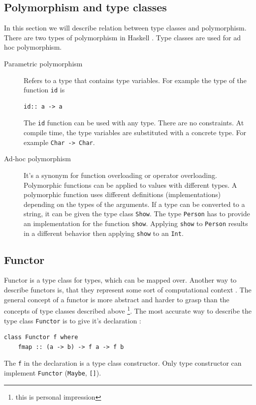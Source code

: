 \subsection{Polymorphism and type classes}
\label{sec:polymorphism}
In this section we will describe relation between type classes and polymorphism.
There are two types of polymorphism in Haskell \cite{Cardelli}. Type classes are used for ad hoc polymorphism.
\begin{description}
\item[Parametric polymorphism] Refers to a type that contains type variables. For example the type of the function \verb|id| is 
\begin{verbatim}
id:: a -> a
\end{verbatim}
The \verb|id| function can be used with any type. There are no constraints. At compile time, the type variables are substituted with a concrete type. For example
\verb|Char -> Char|.
\item[Ad-hoc polymorphism] It's a synonym for function overloading or operator overloading. Polymorphic functions can be applied to values with different types. A polymorphic function uses different definitions (implementations) depending on the types of the arguments. If a type can be converted to a string, it can be given the type class \verb|Show|. The type \verb|Person| has to provide an implementation for the function \verb|show|. Applying \verb|show| to \verb|Person| results in a different behavior then applying \verb|show| to an \verb|Int|.
\end{description}

\subsection{Functor}
\label{sec:functor}

Functor is a type class for types, which can be mapped over. Another way to describe functors is, that they represent some sort of computational context \cite{yorgey}. The general concept of a functor is more abstract and harder to grasp than the concepts of type classes described above \footnote{this is personal impression}.
The most accurate way to describe the type class \verb|Functor| is to give it's declaration \cite{data.functor}:

\begin{verbatim}
class Functor f where
    fmap :: (a -> b) -> f a -> f b
\end{verbatim}

The \verb|f| in the declaration is a type class constructor. Only type constructor can implement \verb|Functor| (\verb|Maybe|, \verb|[]|).

